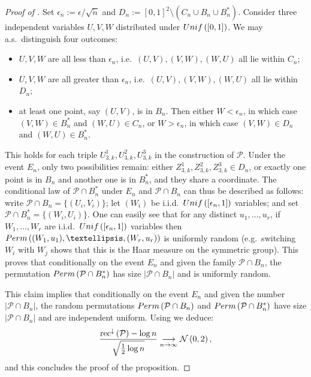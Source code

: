 \documentclass{article}
\theoremstyle{remark}
\newcommand{\cv}[2]{\underset{#1\to#2}{\longrightarrow}}
\newcommand{\card}[1]{\left|#1\right|}
\newcommand{\Unif}[1]{{\rm Unif}\left(#1\right)}
\newcommand{\Normal}[2]{{\cal N}\left(#1 , #2\right)}
\newcommand{\lrec}[1]{\mathrm{rec}^\downarrow\left(#1\right)}
\def\carre{[0,1]^2}
\def\pts{\mathcal{P}}
\newcommand{\perm}[1]{{\rm Perm}\left(#1\right)}
\begin{document}
\begin{proof}[Proof of ]
    Set $\epsilon_n := \epsilon/\sqrt{\check n}$ and $D_n := \carre\setminus\left( C_n\cup B_n\cup B_n^*\right)$.
    Consider three independent variables $U,V,W$ distributed under $\Unif{[0,1]}$.
    We may a.s.~distinguish four outcomes:
    \begin{itemize}
        \item $U,V,W$ are all less than $\epsilon_n$, i.e.~$(U,V),(V,W),(W,U)$ all lie within $C_n$;
        \item $U,V,W$ are all greater than $\epsilon_n$, i.e.~$(U,V),(V,W),(W,U)$ all lie within $D_n$;
        \item at least one point, say $(U,V)$, is in $B_n$.
        Then either $W<\epsilon_n$, in which case $(V,W)\in B_n^*$ and $(W,U)\in C_n$, or $W>\epsilon_n$, in which case $(V,W)\in D_n$ and $(W,U)\in B_n^*$.
    \end{itemize}
    This holds for each triple $U_{3,k}^1,U_{3,k}^2,U_{3,k}^3$ in the construction of $\pts$.
    Under the event $E_n$, only two possibilities remain: either $Z_{3,k}^1,Z_{3,k}^2,Z_{3,k}^3\in D_n$, or exactly one point is in $B_n$ and another one is in $B_n^*$, and they share a coordinate.
    The conditional law of $\pts\cap B_n^*$ under $E_n$ and $\pts\cap B_n$ can thus be described as follows:
    write $\pts\cap B_n = \{(U_i,V_i)\}$; let $(W_i)$ be i.i.d.~$\Unif{[\epsilon_n,1]}$ variables; and set $\pts\cap B_n^* = \{(W_i,U_i)\}$.
    One can easily see that for any distinct $u_1,\dots,u_r$, if $W_1,\dots,W_r$ are i.i.d.~$\Unif{[\epsilon_n,1]}$ variables then $\perm{(W_1,u_1),\dots,(W_r,u_r)}$ is uniformly random (e.g.~switching $W_i$ with $W_j$ shows that this is the Haar measure on the symmetric group).
    This proves that conditionally on the event $E_n$ and given the family $\pts\cap B_n$, the permutation $\perm{\pts\cap B_n^*}$ has size $\card{\pts\cap B_n}$ and is uniformly random.

    This claim implies that conditionally on the event $E_n$ and given the number $\card{\pts\cap B_n}$, the random permutations $\perm{\pts\cap B_n}$ and $\perm{\pts\cap B_n^*}$ have size $\card{\pts\cap B_n}$ and are independent uniform.
    Using  we deduce:
    \begin{equation*}
        \frac{\lrec{\pts}-\log n}{\sqrt{\frac12\log n}}
        \cv{n}{\infty} \Normal{0}{2},
    \end{equation*}
    and this concludes the proof of the proposition.
\end{proof}
\end{document}
